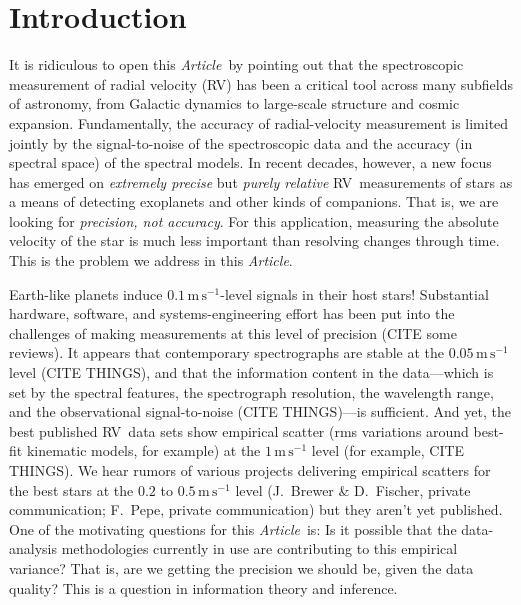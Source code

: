 \documentclass[modern]{aastex62}
\newcommand{\unit}[1]{\mathrm{#1}}
\newcommand{\m}{\unit{m}}
\newcommand{\s}{\unit{s}}
\newcommand{\mps}{\m\,\s^{-1}}
\newcommand{\documentname}{\textsl{Article}}
\newcommand{\acronym}[1]{{\small{#1}}}
\newcommand{\RV}{\acronym{RV}}
\begin{document}

\section*{}
\clearpage
\section{Introduction}

It is ridiculous to open this \documentname\ by pointing out that
the spectroscopic measurement of radial velocity (\RV) has been a
critical tool across many subfields of astronomy, from Galactic
dynamics to large-scale structure and cosmic expansion.
Fundamentally, the accuracy of radial-velocity measurement is limited
jointly by the signal-to-noise of the spectroscopic data and
the accuracy (in spectral space) of the spectral models.
In recent decades, however, a new focus has emerged on \emph{extremely
  precise} but \emph{purely relative} \RV\ measurements of stars as a
means of detecting exoplanets and other kinds of companions.
That is, we are looking for \emph{precision, not accuracy}.
For this application, measuring the absolute velocity of the star is
much less important than resolving changes through time.
This is the problem we address in this \documentname.

Earth-like planets induce $0.1\,\mps$-level signals in their host
stars!
Substantial hardware, software, and systems-engineering effort has
been put into the challenges of making measurements at this level of
precision (CITE some reviews).
It appears that contemporary spectrographs are stable at the
$0.05\,\mps$ level (CITE THINGS), and that the information content in
the data---which is set by the spectral features, the spectrograph
resolution, the wavelength range, and the observational
signal-to-noise (CITE THINGS)---is sufficient.
And yet, the best published \RV\ data sets show empirical scatter
(rms variations around best-fit kinematic models, for example) at the
$1\,\mps$ level (for example, CITE THINGS).
We hear rumors of various projects delivering empirical scatters for
the best stars at the $0.2$ to $0.5\,\mps$ level
(J.~Brewer \& D.~Fischer, private communication; F.~Pepe, private communication)
but they aren't yet published.
One of the motivating questions for this \documentname\ is: Is it possible that
the data-analysis methodologies currently in use are contributing to this
empirical variance?
That is, are we getting the precision we should be, given the data
quality?
This is a question in information theory and inference.
\end{document}
